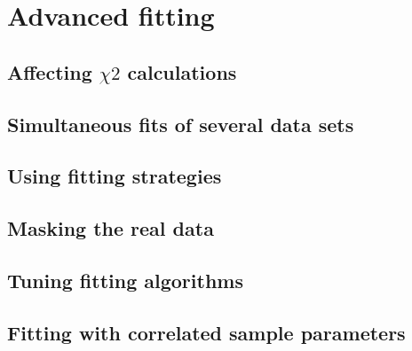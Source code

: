 \section {Advanced fitting} 

\subsection{Affecting $\chi2$ calculations}
\subsection{Simultaneous fits of several data sets}
\subsection{Using fitting strategies}
\subsection{Masking the real data}
\subsection{Tuning fitting algorithms}
\subsection{Fitting with correlated sample parameters}

